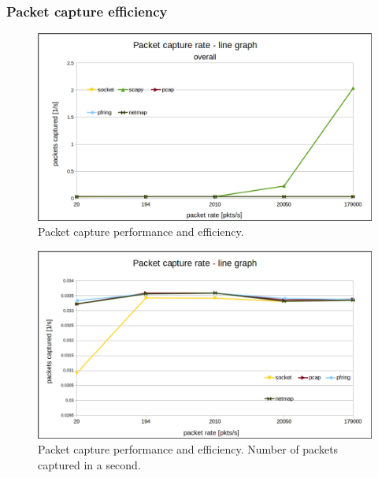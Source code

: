 \documentclass[12pt,a4paper,twoside]{report}
\begin{document}
			\subsubsection*{Packet capture efficiency} \label{analysis:testing:results:capture}
				\begin{figure}[h]
					\centering
					\includegraphics[scale=0.5]{overall_drops_line-graph}
					\caption{Packet capture performance and efficiency.}
					\label{figure:tests:alldrops}
				\end{figure}
				\begin{figure}[h]
					\centering
					\includegraphics[scale=0.5]{closeup_drops_line-graph}
					\caption{Packet capture performance and efficiency. Number of packets captured in a second.}
					\label{figure:tests:closedrops}
				\end{figure}				
				
\end{document}
